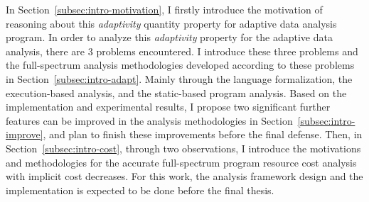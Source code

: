 In Section~\ref{subsec:intro-motivation},
I firstly introduce the motivation of reasoning about this \emph{adaptivity} quantity property 
for adaptive data analysis program.
In order to analyze this \emph{adaptivity} property for the adaptive data analysis, there are 3 problems encountered.
I introduce these three problems
and the full-spectrum analysis methodologies developed according to these problems in Section~\ref{subsec:intro-adapt}.
Mainly through the language formalization,
the execution-based analysis, and the static-based program analysis.
%
Based on the implementation and experimental results, I propose two significant 
further features can be improved in the analysis methodologies in Section~\ref{subsec:intro-improve}, 
and plan to finish these improvements 
before the final defense.
%
 Then, in Section~\ref{subsec:intro-cost}, through two observations, I introduce the motivations and methodologies
 for the accurate full-spectrum program resource cost analysis with implicit cost decreases.
 For this work, the analysis framework design and the implementation is expected to be done before the final thesis.
